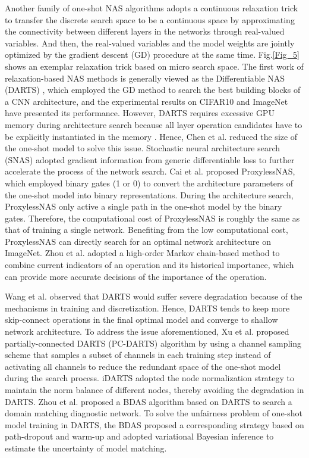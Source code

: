 \documentclass[journal]{IEEEtran}
\begin{document}
Another family of one-shot NAS algorithms adopts a continuous relaxation trick to transfer the discrete search space to be a continuous space by approximating the connectivity between different layers in the networks through real-valued variables. And then, the real-valued variables and the model weights are jointly optimized by the gradient descent (GD) procedure at the same time. Fig.\ref{Fig_5} shows an exemplar relaxation trick based on micro search space. The first work of relaxation-based NAS methods is generally viewed as the Differentiable NAS (DARTS) \cite{liu2018darts}, which employed the GD method to search the best building blocks of a CNN architecture, and the experimental results on CIFAR10 and ImageNet have presented its performance. However, DARTS requires excessive GPU memory during architecture search because all layer operation candidates have to be explicitly instantiated in the memory \cite{9354953}. Hence, Chen et al. \cite{chen2019progressive} reduced the size of the one-shot model to solve this issue. Stochastic neural architecture search (SNAS) \cite{xie2018snas} adopted gradient information from generic differentiable loss to further accelerate the process of the network search. Cai et al. \cite{cai2018proxylessnas} proposed ProxylessNAS, which employed binary gates (1 or 0) to convert the architecture parameters of the one-shot model into binary representations. During the architecture search, ProxylessNAS only active a single path in the one-shot model by the binary gates. Therefore, the computational cost of ProxylessNAS is roughly the same as that of training a single network. Benefiting from the low computational cost, ProxylessNAS can directly search for an optimal network architecture on ImageNet. Zhou et al. \cite{zhou2021exploiting} adopted a high-order Markov chain-based method to combine current indicators of an operation and its historical importance, which can provide more accurate decisions of the importance of the operation.

Wang et al. \cite{9525822} observed that DARTS would suffer severe degradation because of the mechanisms in training and discretization. Hence, DARTS tends to keep more skip-connect operations in the final optimal model and converge to shallow network architecture. To address the issue aforementioned, Xu et al. \cite{xu2019pc, 9354953} proposed partially-connected DARTS (PC-DARTS) algorithm by using a channel sampling scheme that samples a subset of channels in each training step instead of activating all channels to reduce the redundant space of the one-shot model during the search process. iDARTS \cite{9525822} adopted the node normalization strategy to maintain the norm balance of different nodes, thereby avoiding the degradation in DARTS. Zhou et al. \cite{zhou2021bayesian} proposed a BDAS algorithm based on DARTS to search a domain matching diagnostic network. To solve the unfairness problem of one-shot model training in DARTS, the BDAS proposed a corresponding strategy based on path-dropout and warm-up and adopted variational Bayesian inference to estimate the uncertainty of model matching. 
\end{document}

